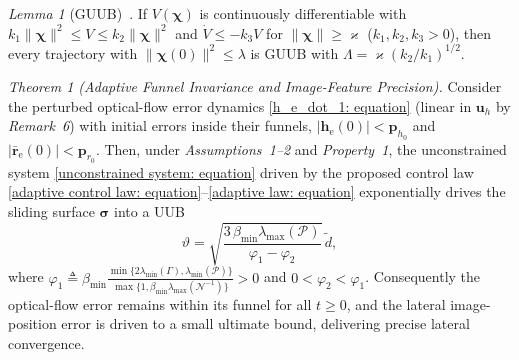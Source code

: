 \documentclass{IEEEtaes}
\begin{document}
\textit{Lemma 1} (GUUB)~\cite{khalil2002}. If $V(\boldsymbol{\chi})$ is continuously differentiable with $k_1\|\boldsymbol{\chi}\|^2\le V\le k_2\|\boldsymbol{\chi}\|^2$ and $\dot{V}\le -k_3 V$ for $\|\boldsymbol{\chi}\|\ge\varkappa$ ($k_1,k_2,k_3>0$), then every trajectory with $\|\boldsymbol{\chi}(0)\|^2\le\lambda$ is GUUB with $\Lambda = \varkappa(k_2/k_1)^{1/2}$.

\textit{Theorem 1 (Adaptive Funnel Invariance and Image-Feature Precision).}
Consider the perturbed optical-flow error dynamics \eqref{h_e_dot_1: equation} (linear in $\boldsymbol{u}_h$ by \textit{Remark~6}) with initial errors inside their funnels, $|\boldsymbol{h}_\text{e}(0)|<\boldsymbol{p}_{h_0}$ and $|\bar{\boldsymbol{r}}_\text{e}(0)|<\boldsymbol{p}_{r_0}$. Then, under \textit{Assumptions~1--2} and \textit{Property~1}, the unconstrained system \eqref{unconstrained system: equation} driven by the proposed control law \eqref{adaptive control law: equation}--\eqref{adaptive law: equation} exponentially drives the sliding surface $\boldsymbol{\sigma}$ into a UUB
\begin{equation} \label{UUB bound: equation}
    \vartheta = \sqrt{\frac{3\,\beta_{\min}\lambda_{\max}(\mathcal{P})}{\varphi_1-\varphi_2}}\,\tilde{d},
\end{equation}
where $\varphi_1 \triangleq \beta_{\min}\frac{\min\{2\lambda_{\min}(\Gamma),\lambda_{\min}(\mathcal{P})\}}{\max\{1,\beta_{\min}\lambda_{\max}(\mathcal{N}^{-1})\}}>0$ and $0<\varphi_2<\varphi_1$. Consequently the optical-flow error remains within its funnel for all $t\ge 0$, and the lateral image-position error is driven to a small ultimate bound, delivering precise lateral convergence.
\end{document}
